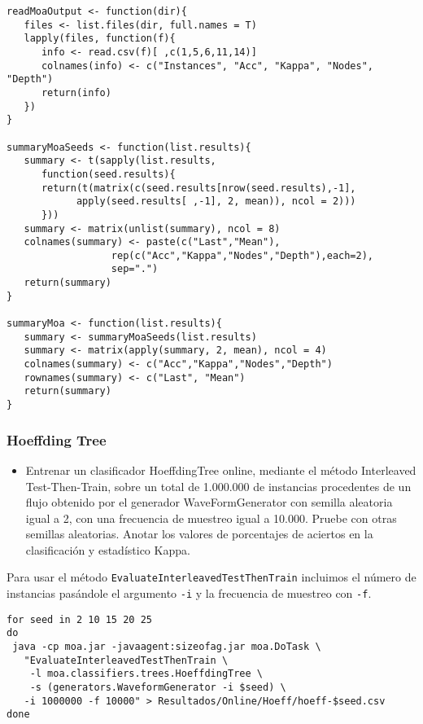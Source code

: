 \documentclass[11pt]{article}
\begin{document}
\begin{verbatim}
readMoaOutput <- function(dir){
   files <- list.files(dir, full.names = T)
   lapply(files, function(f){
      info <- read.csv(f)[ ,c(1,5,6,11,14)]
      colnames(info) <- c("Instances", "Acc", "Kappa", "Nodes", "Depth")
      return(info)
   })
}

summaryMoaSeeds <- function(list.results){
   summary <- t(sapply(list.results,
	  function(seed.results){
	  return(t(matrix(c(seed.results[nrow(seed.results),-1], 
			apply(seed.results[ ,-1], 2, mean)), ncol = 2)))
	  }))
   summary <- matrix(unlist(summary), ncol = 8)
   colnames(summary) <- paste(c("Last","Mean"),
			      rep(c("Acc","Kappa","Nodes","Depth"),each=2),
			      sep=".")
   return(summary)
}

summaryMoa <- function(list.results){
   summary <- summaryMoaSeeds(list.results)
   summary <- matrix(apply(summary, 2, mean), ncol = 4)   
   colnames(summary) <- c("Acc","Kappa","Nodes","Depth")
   rownames(summary) <- c("Last", "Mean")
   return(summary)
}
\end{verbatim}


\subsubsection{Hoeffding Tree}
\label{sec:orgcd9aaf0}
\begin{itemize}
\item Entrenar un clasificador HoeffdingTree online, mediante el método
Interleaved Test-Then-Train, sobre un total de 1.000.000 de
instancias procedentes de un flujo obtenido por el generador
WaveFormGenerator con semilla aleatoria igual a 2, con una
frecuencia de muestreo igual a 10.000. Pruebe con otras semillas
aleatorias. Anotar los valores de porcentajes de aciertos en la
clasificación y estadístico Kappa.
\end{itemize}

Para usar el método \texttt{EvaluateInterleavedTestThenTrain} incluimos el
número de instancias pasándole el argumento \texttt{-i} y la frecuencia de
muestreo con \texttt{-f}.

\begin{verbatim}
for seed in 2 10 15 20 25 
do 
 java -cp moa.jar -javaagent:sizeofag.jar moa.DoTask \
   "EvaluateInterleavedTestThenTrain \
    -l moa.classifiers.trees.HoeffdingTree \
    -s (generators.WaveformGenerator -i $seed) \
   -i 1000000 -f 10000" > Resultados/Online/Hoeff/hoeff-$seed.csv
done
\end{verbatim}
\end{document}
